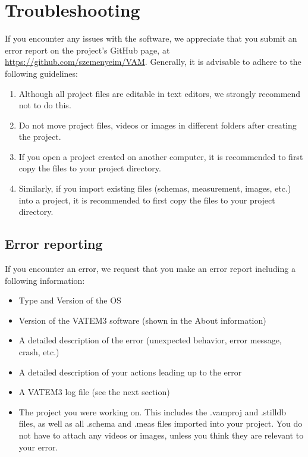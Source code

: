 \documentclass[10pt,a4paper,oneside]{report}             %
\begin{document}
\chapter{Troubleshooting}

If you encounter any issues with the software, we appreciate that you submit an error report on the project's GitHub page, at \url{https://github.com/szemenyeim/VAM}. Generally, it is advisable to adhere to the following guidelines:

\begin{enumerate}
	\item Although all project files are editable in text editors, we strongly recommend not to do this.
	\item Do not move project files, videos or images in different folders after creating the project.
	\item If you open a project created on another computer, it is recommended to first copy the files to your project directory.
	\item Similarly, if you import existing files (schemas, measurement, images, etc.) into a project, it is recommended to first copy the files to your project directory.
\end{enumerate}


\section{Error reporting}

If you encounter an error, we request that you make an error report including a following information:

\begin{itemize}
	\item Type and Version of the OS
	\item Version of the VATEM3 software (shown in the About information)
	\item A detailed description of the error (unexpected behavior, error message, crash, etc.)
	\item A detailed description of your actions leading up to the error
	\item A VATEM3 log file (see the next section)
	\item The project you were working on. This includes the .vamproj and .stilldb files, as well as all .schema and .meas files imported into your project. You do not have to attach any videos or images, unless you think they are relevant to your error.
\end{itemize}
\end{document}
